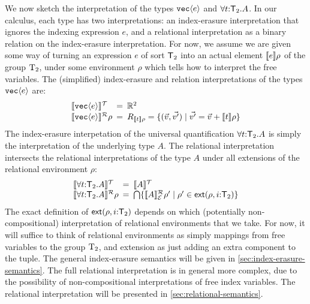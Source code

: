 We now sketch the interpretation of the types $\texttt{vec}\langle e \rangle$ and
$\forall t\mathord:\mathsf{T}_2.A$. In our calculus, each type has two
interpretations: an index-erasure interpretation that ignores the
indexing expression $e$, and a relational interpretation as a binary
relation on the index-erasure interpretation. For now, we assume we
are given some way of turning an expression $e$ of sort $\mathsf{T}_2$
into an actual element $\llbracket e \rrbracket\rho$ of the group $\mathrm{T}_2$, under
some environment $\rho$ which tells how to interpret the free
variables. The (simplified) index-erasure and relation interpretations
of the types $\texttt{vec}\langle e \rangle$ are:
\begin{displaymath}
  \begin{array}{l@{\hspace{0.5em}=\hspace{0.5em}}l}
    \tySem{\tyPrim{vec}{e}} & \mathbb{R}^2 \\
    \rsem{\tyPrim{vec}{e}}{}\rho & R_{\sem{t}\rho} = \{ (\vec{v},\vec{v'}) \sepbar \vec{v'} = \vec{v} + \sem{t}\rho \}
  \end{array}
\end{displaymath}
The index-erasure interpetation of the universal quantification
$\forall t\mathord:\mathsf{T}_2.A$ is simply the interpretation of the
underlying type $A$. The relational interpretation intersects the
relational interpretations of the type $A$ under all extensions of the
relational environment $\rho$:
\begin{displaymath}
  \begin{array}{l@{\hspace{0.5em}=\hspace{0.5em}}l}
    \tySem{\forall t\mathord:\SynTransl_2.A} & \tySem{A} \\
    \rsem{\forall t\mathord:\SynTransl_2.A}{}\rho & \bigcap\{ \rsem{A}{\relEnv{E}}\rho' \sepbar \rho' \in \extends{\rho}{i\mathord:\SynTransl_2} \}
  \end{array}
\end{displaymath}
The exact definition of $\mathsf{ext}(\rho,i\mathord:\mathsf{T}_2)$
depends on which (potentially non-compositional) interpretation of
relational environments that we take. For now, it will suffice to
think of relational environments as simply mappings from free
variables to the group $\mathrm{T}_2$, and extension as just adding an
extra component to the tuple. The general index-erasure semantics will
be given in \autoref{sec:index-erasure-semantics}. The full relational
interpretation is in general more complex, due to the possibility of
non-compositional interpretations of free index variables. The
relational interpretation will be presented in
\autoref{sec:relational-semantics}.

